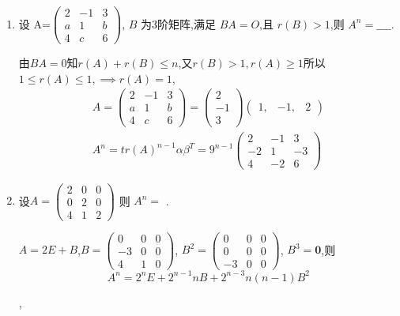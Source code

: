 \documentclass[12pt, a4paper, oneside, UTF8]{ctexbook}
\begin{document}
\begin{enumerate}[label=\arabic*.]
    \item 设 A=$\left(\begin{array}{rrr}
        2&-1&3\\
        a&1&b\\
        4&c&6
    \end{array}\right)$,
        $ B $ 为3阶矩阵,满足 $ BA = O $,且 $ r(B) > 1 $,则 $ A^n =\_\_\_\_$.
    \begin{solution}
    由$BA=0$知$r(A)+r(B)\leq n$,又$r(B)>1,r(A)\geq 1$所以$1\leq r(A)\leq 1,\implies r(A)=1$,
    \begin{align*}
        A=\left(\begin{array}{rrr}
        2&-1&3\\
        a&1&b\\
        4&c&6
    \end{array}\right)=\begin{pmatrix}
        2\\
        -1\\
        3
    \end{pmatrix}\begin{pmatrix}
        1,&-1,&2
    \end{pmatrix} \\
    A^n=tr(A)^{n-1}\alpha\beta^{T}=9^{n-1}\begin{pmatrix}
        2& -1& 3\\
        -2& 1& -3\\
        4& -2& 6
    \end{pmatrix}
    \end{align*}
    \end{solution}
    \item 设$
    A = \begin{pmatrix}
    2 & 0 & 0 \\
    0 & 2 & 0 \\
    4 & 1&  2
    \end{pmatrix}$
    则 $ A^n = $ \underline{\hspace{3cm}}.
    
    \begin{solution}
    $A=2E+B$,$B=\begin{pmatrix}
        0& 0& 0\\
        -3& 0& 0\\
        4& 1& 0
    \end{pmatrix}$, $B^2=\begin{pmatrix}
        0& 0& 0\\
        0& 0& 0\\
        -3& 0& 0
    \end{pmatrix}$, $B^3=\mathbf{0}$,则
    \[
    A^n=2^nE+2^{n-1}nB+2^{n-3}n(n-1)B^2
    \]
    \end{solution},
    

\end{enumerate}
\end{document}
